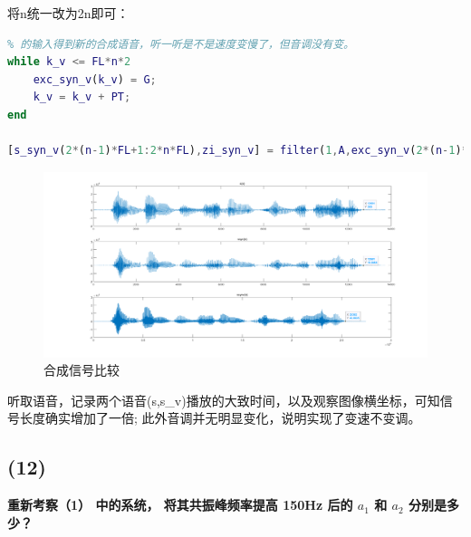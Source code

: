 \documentclass[10pt]{article}
\begin{document}
将n统一改为2n即可：
\begin{lstlisting}[language=matlab]
% (11) 不改变基音周期和预测系数，将合成激励的长度增加一倍，再作为filter
% 的输入得到新的合成语音，听一听是不是速度变慢了，但音调没有变。
while k_v <= FL*n*2
    exc_syn_v(k_v) = G;
    k_v = k_v + PT;
end

[s_syn_v(2*(n-1)*FL+1:2*n*FL),zi_syn_v] = filter(1,A,exc_syn_v(2*(n-1)*FL+1:2*n*FL),zi_syn_v);
\end{lstlisting}
\begin{figure}[h]
	\centering
	\begin{minipage}{0.49\linewidth}
		\centering
		\includegraphics[width=1\linewidth]{drawing2-11.png}
		\caption{合成信号比较}
	\end{minipage}
\end{figure}
听取语音，记录两个语音(s,s\_v)播放的大致时间，以及观察图像横坐标，可知信号长度确实增加了一倍;
此外音调并无明显变化，说明实现了变速不变调。

\subsection*{(12)}
\textbf{\color{gray}重新考察（1） 中的系统， 
将其共振峰频率提高 150Hz 后的 $a_1$ 和 $a_2$ 分别是多少？}
\end{document}
